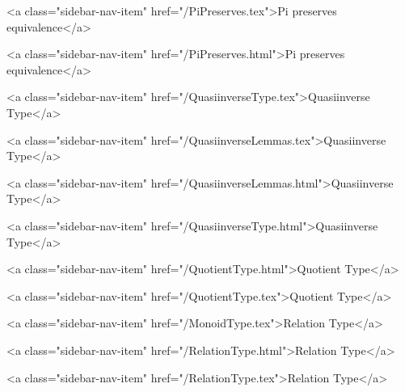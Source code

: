       
        
          <a class="sidebar-nav-item" href="/PiPreserves.tex">Pi preserves equivalence</a>
        
      
    
      
        
          <a class="sidebar-nav-item" href="/PiPreserves.html">Pi preserves equivalence</a>
        
      
    
      
        
          <a class="sidebar-nav-item" href="/QuasiinverseType.tex">Quasiinverse Type</a>
        
      
    
      
        
          <a class="sidebar-nav-item" href="/QuasiinverseLemmas.tex">Quasiinverse Type</a>
        
      
    
      
        
          <a class="sidebar-nav-item" href="/QuasiinverseLemmas.html">Quasiinverse Type</a>
        
      
    
      
        
          <a class="sidebar-nav-item" href="/QuasiinverseType.html">Quasiinverse Type</a>
        
      
    
      
        
          <a class="sidebar-nav-item" href="/QuotientType.html">Quotient Type</a>
        
      
    
      
        
          <a class="sidebar-nav-item" href="/QuotientType.tex">Quotient Type</a>
        
      
    
      
        
          <a class="sidebar-nav-item" href="/MonoidType.tex">Relation Type</a>
        
      
    
      
        
          <a class="sidebar-nav-item" href="/RelationType.html">Relation Type</a>
        
      
    
      
        
          <a class="sidebar-nav-item" href="/RelationType.tex">Relation Type</a>
        
